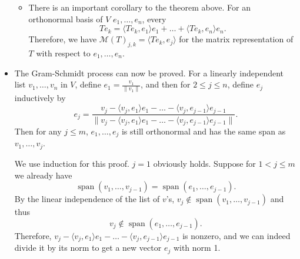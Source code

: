 \documentclass[11pt]{article}
\newcommand{\s}{\operatorname{span}}
\newcommand{\inp}[2]{\langle #1, #2 \rangle}
\newcommand{\nm}[1]{\lVert #1 \rVert}
\newcommand{\M}{\mathcal{M}}
\begin{document}
\begin{itemize}
    \begin{itemize}
        \item There is an important corollary to the theorem above. For an orthonormal basis of $V$ $e_1,\dots,e_n$, every $$Te_k = \inp{Te_k}{e_1}e_1 + \dots + \inp{Te_k}{e_n}e_n.$$ Therefore, we have $\M(T)_{j,k} = \inp{Te_k}{e_j}$ for the matrix representation of $T$ with respect to $e_1,\dots,e_n$.
    \end{itemize}
    \item The Gram-Schmidt process can now be proved. For a linearly independent list $v_1,\dots,v_n$ in $V$, define $e_1 = \frac{v_1}{\nm{v_1}}$, and then for $2 \leq j \leq n$, define $e_j$ inductively by $$e_j = \frac{v_j - \inp{v_j}{e_1}e_1 - \dots - \inp{v_j}{e_{j-1}}e_{j-1}}{\nm{v_j - \inp{v_j}{e_1}e_1 - \dots - \inp{v_j}{e_{j-1}}e_{j-1}}}.$$ Then for any $j \leq m$, $e_1, \dots, e_j$ is still orthonormal and has the same span as $v_1,\dots,v_j$. 
    
    We use induction for this proof. $j = 1$ obviously holds. Suppose for $1 < j \leq m$ we already have \[\s(v_1,\dots,v_{j-1}) = \s(e_1,\dots,e_{j-1}).\] By the linear independence of the list of $v$'s, $v_j \notin \s(v_1,\dots,v_{j-1})$ and thus \[v_j \notin \s(e_1,\dots,e_{j-1}).\] Therefore, $v_j - \inp{v_j}{e_1}e_1 - \dots - \inp{v_j}{e_{j-1}}e_{j-1}$ is nonzero, and we can indeed divide it by its norm to get a new vector $e_j$ with norm 1.
    

\end{itemize}
\end{document}

